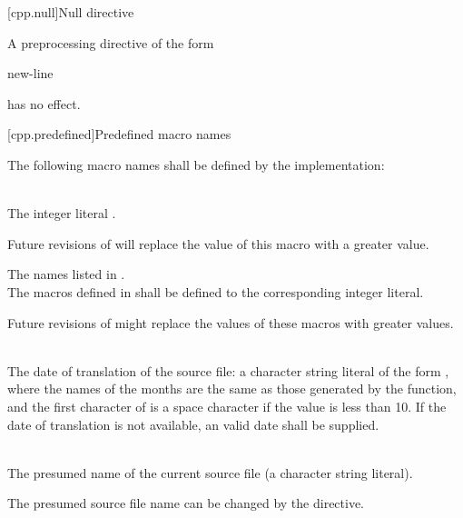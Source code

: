 [cpp.null]{Null directive}%

\pnum
A preprocessing directive of the form
\begin{ncsimplebnf}
\terminal{\#} new-line
\end{ncsimplebnf}
has no effect.

[cpp.predefined]{Predefined macro names}
%

\pnum
The following macro names shall be defined by the implementation:

\begin{description}

\item
{}%
\\
The integer literal \tcode{\cppver}.
\begin{note}
Future revisions of \Cpp{} will
replace the value of this macro with a greater value.
\end{note}

\item The names listed in .\\
The macros defined in  shall be defined to
the corresponding integer literal.
\begin{note}
Future revisions of \Cpp{} might replace
the values of these macros with greater values.
\end{note}

\item
{}%
\\
The date of translation of the source file:
a character string literal of the form
,
where the names of the months are the same as those generated
by the
function,
and the first character of
is a space character if the value is less than 10.
If the date of translation is not available,
an  valid date
shall be supplied.

\item
{}%
\\
The presumed name of the current source file (a character string
literal).
\begin{footnote}
The presumed source file name can be changed by the  directive.
\end{footnote}


\end{description}

